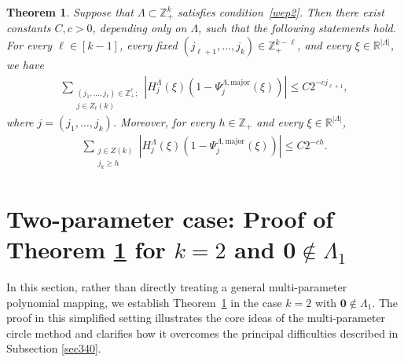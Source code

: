 \documentclass[10pt,a4paper]{amsart}
\newtheorem{theorem}{Theorem}\numberwithin{theorem}{section}
\numberwithin{equation}{section}
\begin{document}
\begin{theorem}\label{th41}
	Suppose that
	$\Lambda\subset\mathbb{Z}_+^k$
	satisfies condition~\eqref{wep2}.
	Then there exist constants $C,c>0$, depending only on $\Lambda$,
	such that the following statements hold.
	For every $\ell\in[k-1]$, every fixed
	$(j_{\ell+1},\ldots,j_k)\in\mathbb{Z}_+^{k-\ell}$, and every
	$\xi\in\mathbb{R}^{|\Lambda|}$, we have
	\begin{align}\label{rr1}
		\sum_{\substack{(j_1,\ldots,j_\ell)\in\mathbb{Z}_+^\ell ;\\
				j\in Z_\ell(k)}}
		\left|
		H_j^\Lambda(\xi)
		\left(
		1-\Psi_j^{\Lambda,\mathrm{major}}(\xi)
		\right)
		\right|
		\leq C2^{-c j_{\ell+1}},
	\end{align}
	where
	$j=(j_1,\ldots,j_k)$.
	Moreover, for every $h\in\mathbb{Z}_+$ and every
	$\xi\in\mathbb{R}^{|\Lambda|}$,
	\begin{align}\label{bb330}
		\sum_{\substack{j\in Z(k)\\ j_k\geq h}}
		\left|
		H_j^\Lambda(\xi)
		\left(
		1-\Psi_j^{\Lambda,\mathrm{major}}(\xi)
		\right)
		\right|
		\leq C2^{-ch}.
	\end{align}
\end{theorem}






 







 
 
\section{Two-parameter case: Proof of Theorem \ref{th41} for $k=2$ and   $\textbf{0}\notin \Lambda_1$}\label{sec4}
In this section, rather than directly treating a general multi-parameter polynomial mapping, we establish Theorem~\ref{th41} in the case $k=2$ with $\textbf{0}\notin \Lambda_1$.
The proof in this simplified setting illustrates the core ideas of the multi-parameter circle method and clarifies how it overcomes the principal difficulties described in Subsection \ref{sec340}.
\end{document}
